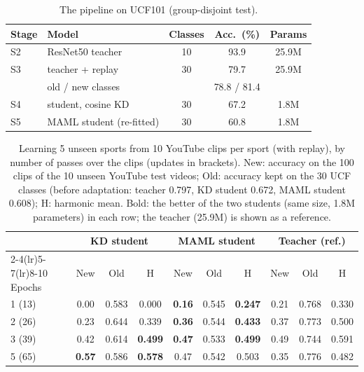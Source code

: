 \documentclass[conference]{IEEEtran}
\begin{document}
\begin{table}[t]
\centering
\caption{The pipeline on UCF101 (group-disjoint test).}
\label{tab:ulal}
\renewcommand{\arraystretch}{1.1}
\setlength{\tabcolsep}{4pt}
\begin{tabular}{llccc}
\toprule
Stage & Model & Classes & Acc.\ (\%) & Params \\
\midrule
S2 & ResNet50 teacher          & 10 & 93.9 & 25.9M \\
S3 & teacher + replay          & 30 & 79.7 & 25.9M \\
   & \quad old / new classes   &    & 78.8 / 81.4 & \\
S4 & student, cosine KD        & 30 & 67.2 & 1.8M \\
S5 & MAML student (re-fitted)  & 30 & 60.8 & 1.8M \\
\bottomrule
\end{tabular}
\end{table}

\begin{table}[t]
\centering
\caption{Learning 5 unseen sports from 10 YouTube clips per sport (with replay), by number of
passes over the clips (updates in brackets). New: accuracy on the 100 clips of the 10
unseen YouTube test videos; Old: accuracy kept on the 30 UCF classes (before adaptation:
teacher 0.797, KD student 0.672, MAML student 0.608); H: harmonic mean. Bold: the better of
the two students (same size, 1.8M parameters) in each row; the teacher (25.9M) is shown as a
reference.}
\label{tab:youtube}
\renewcommand{\arraystretch}{1.1}
\setlength{\tabcolsep}{2.2pt}
\footnotesize
\begin{tabular}{lccccccccc}
\toprule
 & \multicolumn{3}{c}{KD student} & \multicolumn{3}{c}{MAML student} & \multicolumn{3}{c}{Teacher (ref.)} \\
\cmidrule(lr){2-4}\cmidrule(lr){5-7}\cmidrule(lr){8-10}
Epochs & New & Old & H & New & Old & H & New & Old & H \\
\midrule
1 (13) & 0.00 & 0.583 & 0.000 & \textbf{0.16} & 0.545 & \textbf{0.247} & 0.21 & 0.768 & 0.330 \\
2 (26) & 0.23 & 0.644 & 0.339 & \textbf{0.36} & 0.544 & \textbf{0.433} & 0.37 & 0.773 & 0.500 \\
3 (39) & 0.42 & 0.614 & \textbf{0.499} & \textbf{0.47} & 0.533 & \textbf{0.499} & 0.49 & 0.744 & 0.591 \\
5 (65) & \textbf{0.57} & 0.586 & \textbf{0.578} & 0.47 & 0.542 & 0.503 & 0.35 & 0.776 & 0.482 \\
\bottomrule
\end{tabular}
\end{table}
\end{document}
